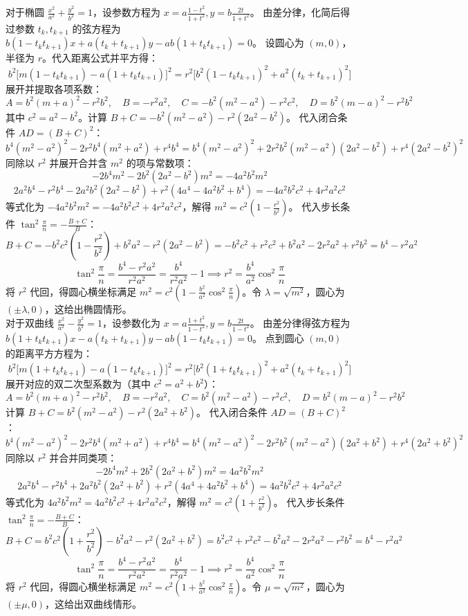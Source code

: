 \begin{solution}
对于椭圆 $\frac{x^2}{a^2} + \frac{y^2}{b^2} = 1$，设参数方程为 $x = a\frac{1-t^2}{1+t^2}, y = b\frac{2t}{1+t^2}$。
由差分律，化简后得过参数 $t_k, t_{k+1}$ 的弦方程为 $b(1-t_k t_{k+1})x + a(t_k+t_{k+1})y - ab(1+t_k t_{k+1}) = 0$。
设圆心为 $(m,0)$，半径为 $r$。代入距离公式并平方得：
$$ b^2 \big[ m(1-t_k t_{k+1}) - a(1+t_k t_{k+1}) \big]^2 = r^2 \big[ b^2(1-t_k t_{k+1})^2 + a^2(t_k+t_{k+1})^2 \big] $$
展开并提取各项系数：
$$ A = b^2(m+a)^2 - r^2 b^2, \quad B = -r^2 a^2, \quad C = -b^2(m^2-a^2) - r^2 c^2, \quad D = b^2(m-a)^2 - r^2 b^2 $$
其中 $c^2 = a^2-b^2$。计算 $B+C = -b^2(m^2-a^2) - r^2(2a^2-b^2)$。
代入闭合条件 $AD = (B+C)^2$：
$$ b^4(m^2-a^2)^2 - 2r^2 b^4(m^2+a^2) + r^4 b^4 = b^4(m^2-a^2)^2 + 2r^2 b^2(m^2-a^2)(2a^2-b^2) + r^4(2a^2-b^2)^2 $$
同除以 $r^2$ 并展开合并含 $m^2$ 的项与常数项：
$$ -2b^4 m^2 - 2b^2(2a^2-b^2)m^2 = -4a^2 b^2 m^2 $$
$$ 2a^2 b^4 - r^2 b^4 - 2a^2 b^2(2a^2-b^2) + r^2(4a^4 - 4a^2 b^2 + b^4) = -4a^2 b^2 c^2 + 4r^2 a^2 c^2 $$
等式化为 $-4a^2 b^2 m^2 = -4a^2 b^2 c^2 + 4r^2 a^2 c^2$，解得 $m^2 = c^2\left(1 - \frac{r^2}{b^2}\right)$。
代入步长条件 $\tan^2\frac{\pi}{n} = -\frac{B+C}{B}$：
$$ B+C = -b^2 c^2\left(1 - \frac{r^2}{b^2}\right) + b^2 a^2 - r^2(2a^2-b^2) = -b^2 c^2 + r^2 c^2 + b^2 a^2 - 2r^2 a^2 + r^2 b^2 = b^4 - r^2 a^2 $$
$$ \tan^2\frac{\pi}{n} = \frac{b^4 - r^2 a^2}{r^2 a^2} = \frac{b^4}{r^2 a^2} - 1 \implies r^2 = \frac{b^4}{a^2}\cos^2\frac{\pi}{n} $$
将 $r^2$ 代回，得圆心横坐标满足 $m^2 = c^2\left(1 - \frac{b^2}{a^2}\cos^2\frac{\pi}{n}\right)$。令 $\lambda = \sqrt{m^2}$，圆心为 $(\pm \lambda, 0)$，这给出椭圆情形。\\
对于双曲线 $\frac{x^2}{a^2} - \frac{y^2}{b^2} = 1$，设参数化为 $x = a\frac{1+t^2}{1-t^2}, y = b\frac{2t}{1-t^2}$。
由差分律得弦方程为 $b(1+t_k t_{k+1})x - a(t_k+t_{k+1})y - ab(1-t_k t_{k+1}) = 0$。
点到圆心 $(m,0)$ 的距离平方方程为：
$$ b^2 \big[ m(1+t_k t_{k+1}) - a(1-t_k t_{k+1}) \big]^2 = r^2 \big[ b^2(1+t_k t_{k+1})^2 + a^2(t_k+t_{k+1})^2 \big] $$
展开对应的双二次型系数为（其中 $c^2 = a^2+b^2$）：
$$ A = b^2(m+a)^2 - r^2 b^2, \quad B = -r^2 a^2, \quad C = b^2(m^2-a^2) - r^2 c^2, \quad D = b^2(m-a)^2 - r^2 b^2 $$
计算 $B+C = b^2(m^2-a^2) - r^2(2a^2+b^2)$。
代入闭合条件 $AD = (B+C)^2$：
$$ b^4(m^2-a^2)^2 - 2r^2 b^4(m^2+a^2) + r^4 b^4 = b^4(m^2-a^2)^2 - 2r^2 b^2(m^2-a^2)(2a^2+b^2) + r^4(2a^2+b^2)^2 $$
同除以 $r^2$ 并合并同类项：
$$ -2b^4 m^2 + 2b^2(2a^2+b^2)m^2 = 4a^2 b^2 m^2 $$
$$ 2a^2 b^4 - r^2 b^4 + 2a^2 b^2(2a^2+b^2) + r^2(4a^4 + 4a^2 b^2 + b^4) = 4a^2 b^2 c^2 + 4r^2 a^2 c^2 $$
等式化为 $4a^2 b^2 m^2 = 4a^2 b^2 c^2 + 4r^2 a^2 c^2$，解得 $m^2 = c^2\left(1 + \frac{r^2}{b^2}\right)$。
代入步长条件 $\tan^2\frac{\pi}{n} = -\frac{B+C}{B}$：
$$ B+C = b^2 c^2\left(1 + \frac{r^2}{b^2}\right) - b^2 a^2 - r^2(2a^2+b^2) = b^2 c^2 + r^2 c^2 - b^2 a^2 - 2r^2 a^2 - r^2 b^2 = b^4 - r^2 a^2 $$
$$ \tan^2\frac{\pi}{n} = \frac{b^4 - r^2 a^2}{r^2 a^2} = \frac{b^4}{r^2 a^2} - 1 \implies r^2 = \frac{b^4}{a^2}\cos^2\frac{\pi}{n} $$
将 $r^2$ 代回，得圆心横坐标满足 $m^2 = c^2\left(1 + \frac{b^2}{a^2}\cos^2\frac{\pi}{n}\right)$。令 $\mu = \sqrt{m^2}$，圆心为 $(\pm \mu, 0)$，这给出双曲线情形。
\end{solution}

